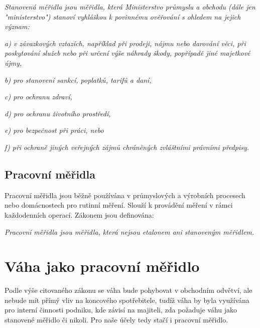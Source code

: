 \textit{Stanovená měřidla jsou měřidla, která Ministerstvo průmyslu a obchodu (dále jen "ministerstvo") stanoví vyhláškou k povinnému ověřování s ohledem na jejich význam:}

\textit{a) v závazkových vztazích, například při prodeji, nájmu nebo darování věci, při poskytování služeb nebo při určení výše náhrady škody, popřípadě jiné majetkové újmy,}

\textit{b) pro stanovení sankcí, poplatků, tarifů a daní,}

\textit{c) pro ochranu zdraví,}

\textit{d) pro ochranu životního prostředí,}

\textit{e) pro bezpečnost při práci, nebo}

\textit{f) při ochraně jiných veřejných zájmů chráněných zvláštními právními předpisy.} \cite{Zákon o metrologii}

\subsection{Pracovní měřidla}
Pracovní měřidla jsou běžně používána v průmyslových a výrobních procesech nebo domácnostech pro rutinní měření. Slouží k provádění měření v rámci každodenních operací. Zákonem jsou definována:

\textit{Pracovní měřidla jsou měřidla, která nejsou etalonem ani stanoveným měřidlem.} \cite{Zákon o metrologii}


\section{Váha jako pracovní měřidlo}
\label{meridlo}
Podle výše citovaného zákonu se váha bude pohybovat v obchodním odvětví, ale nebude mít přímý vliv na koncového spotřebitele, tudíž váha by byla využívána pro interní činnosti podniku, kde závisí na majiteli, zda požaduje váhu jako stanovené měřidlo či nikoli. Pro naše účely tedy stačí i pracovní měřidlo.



